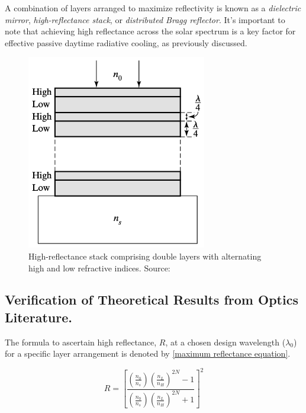 A combination of layers arranged to maximize reflectivity is known as a \emph{dielectric mirror}, \emph{high-reflectance stack}, or \emph{distributed Bragg reflector}. It's important to note that achieving high reflectance across the solar spectrum is a key factor for effective passive daytime radiative cooling, as previously discussed.

\begin{figure}[H]
  \centering
  \includegraphics[width=0.7\textwidth]{Chapters/Figures/Chapter 4 Figures/High-Reflectance Stack of Double Layers.png}
  \caption{High-reflectance stack comprising double layers with alternating high and low refractive indices. Source: \cite{pedrotti_introduction_2007}}
  \label{fig:visualizing high-reflectance stack with alternating indices}
\end{figure}

\subsection{Verification of Theoretical Results from Optics Literature.}
The formula to ascertain high reflectance, $R$, at a chosen design wavelength ($\lambda_0$) for a specific layer arrangement is denoted by \ref{maximum reflectance equation}.

\begin{equation}\label{formula for optimal reflectance - chap4}
    R = \left[ \frac{ \left( \frac{n_0}{n_s} \right) \left( \frac{n_L}{n_H} \right)^{2N}  - 1 }{  \left( \frac{n_0}{n_s} \right) \left( \frac{n_L}{n_H} \right)^{2N}  + 1}  \right]^2
\end{equation}

